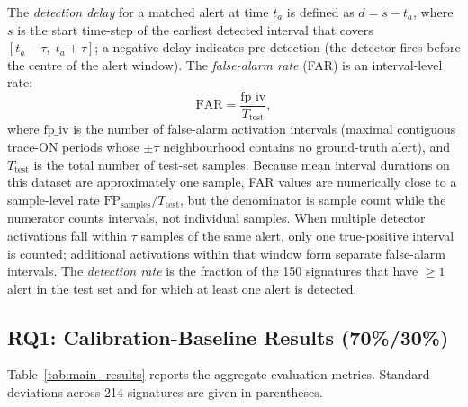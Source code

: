 \documentclass[a4paper,fleqn]{cas-sc}
\theoremstyle{plain}
\begin{document}
The \emph{detection delay} for a matched alert at time $t_a$ is defined as
$d = s - t_a$, where $s$ is the start time-step of the earliest detected
interval that covers $[t_a - \tau,\; t_a + \tau]$; a negative delay indicates
pre-detection (the detector fires before the centre of the alert window).
The \emph{false-alarm rate} (FAR) is an interval-level rate:
\begin{equation*}
  \text{FAR} = \frac{\text{fp\_iv}}{T_{\text{test}}},
\end{equation*}
where $\text{fp\_iv}$ is the number of false-alarm activation intervals
(maximal contiguous trace-ON periods whose $\pm\tau$ neighbourhood contains
no ground-truth alert), and $T_{\text{test}}$ is the total number of test-set
samples.  Because mean interval durations on this dataset are approximately
one sample, FAR values are numerically close to a sample-level rate
$\text{FP}_{\text{samples}}/T_{\text{test}}$, but the denominator is sample
count while the numerator counts intervals, not individual samples.
When multiple detector activations fall within $\tau$ samples of the same
alert, only one true-positive interval is counted; additional activations within
that window form separate false-alarm intervals.
The \emph{detection rate} is the fraction of the 150 signatures that have
$\geq 1$ alert in the test set and for which at least one alert is detected.

\subsection{RQ1: Calibration-Baseline Results (70\%/30\%)}\label{sec:largescale:RQ1}

\noindent{}

\medskip
Table~\ref{tab:main_results} reports the aggregate evaluation metrics.
Standard deviations across 214 signatures are given in parentheses.
\end{document}
